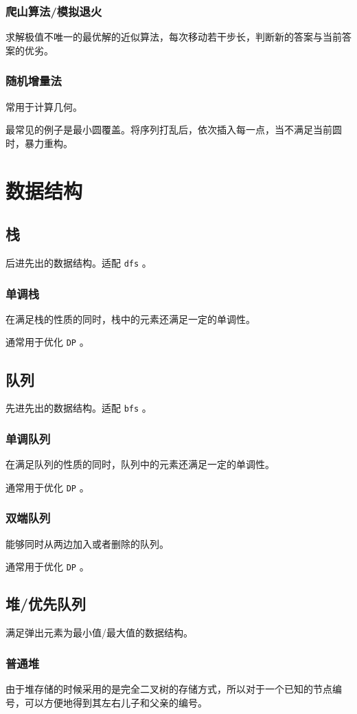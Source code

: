 \documentclass[UTF-8]{ctexart}
\begin{document}
	\subsubsection{爬山算法/模拟退火}
	求解极值不唯一的最优解的近似算法，每次移动若干步长，判断新的答案与当前答案的优劣。
	
	\subsubsection{随机增量法}
	常用于计算几何。
	
	最常见的例子是最小圆覆盖。将序列打乱后，依次插入每一点，当不满足当前圆时，暴力重构。
	\newpage
	\section{数据结构}
	\subsection{栈}
	后进先出的数据结构。适配 \texttt{dfs} 。
	\subsubsection{单调栈}
	在满足栈的性质的同时，栈中的元素还满足一定的单调性。
	
	通常用于优化 \texttt{DP} 。
	\subsection{队列}
	先进先出的数据结构。适配 \texttt{bfs} 。
	\subsubsection{单调队列}
	在满足队列的性质的同时，队列中的元素还满足一定的单调性。
	
	通常用于优化 \texttt{DP} 。
	\subsubsection{双端队列}
	能够同时从两边加入或者删除的队列。
	
	通常用于优化 \texttt{DP} 。
	\subsection{堆/优先队列}
	满足弹出元素为最小值/最大值的数据结构。
	\subsubsection{普通堆}
	由于堆存储的时候采用的是完全二叉树的存储方式，所以对于一个已知的节点编号，可以方便地得到其左右儿子和父亲的编号。
\end{document}
